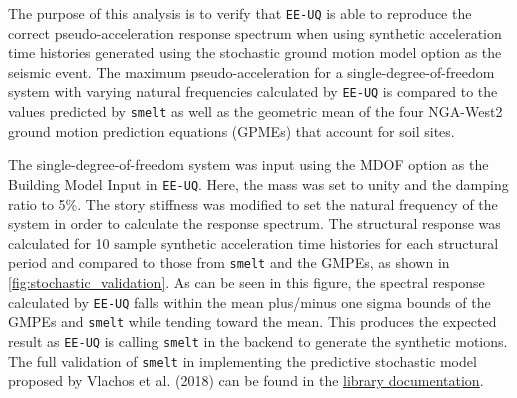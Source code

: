 The purpose of this analysis is to verify that \texttt{EE-UQ} is able
to reproduce the correct pseudo-acceleration response spectrum when
using synthetic acceleration time histories generated using the
stochastic ground motion model option as the seismic event. The maximum
pseudo-acceleration for a single-degree-of-freedom system with varying
natural frequencies calculated by \texttt{EE-UQ} is compared to the
values predicted by \texttt{smelt} as well as the geometric mean
of the four NGA-West2 ground motion prediction equations (GPMEs)
that account for soil sites. 

The single-degree-of-freedom system was input using the MDOF option as
the Building Model Input in \texttt{EE-UQ}. Here, the mass was set to
unity and the damping ratio to 5\%. The story stiffness was modified
to set the natural frequency of the system in order to calculate the
response spectrum. The structural response was calculated for 10
sample synthetic acceleration time histories for each structural
period and compared to those from \texttt{smelt} and the GMPEs, as
shown in \autoref{fig:stochastic_validation}. As can be seen in this
figure, the spectral response calculated by \texttt{EE-UQ} falls
within the mean plus/minus one sigma bounds of the GMPEs and
\texttt{smelt} while tending toward the mean. This produces the
expected result as \texttt{EE-UQ} is calling \texttt{smelt} in the
backend to generate the synthetic motions. The full validation of
\texttt{smelt} in implementing the predictive stochastic model
proposed by Vlachos et al. (2018) \cite{vlachos2018predictive} can be
found in the
\href{https://github.com/shellshocked2003/Stochastic-Loading-Module/blob/master/README.md}{library
  documentation}.


